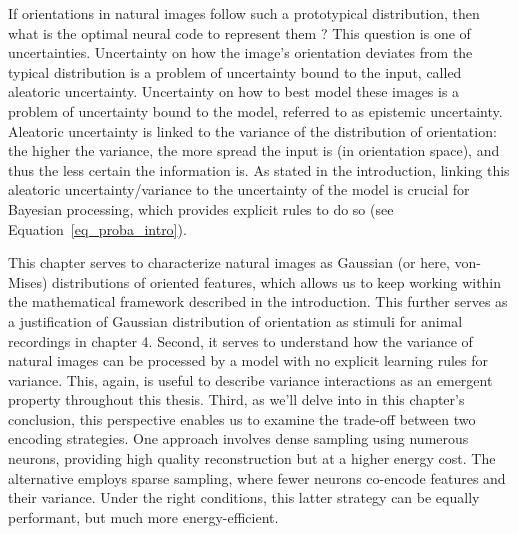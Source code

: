 If orientations in natural images follow such a prototypical distribution, then what is the optimal neural code to represent them ? This question is one of uncertainties. Uncertainty on how the image's orientation deviates from the typical distribution is a problem of uncertainty bound to the input, called aleatoric uncertainty. Uncertainty on how to best model these images is a problem of uncertainty bound to the model, referred to as epistemic uncertainty. Aleatoric uncertainty is linked to the variance of the distribution of orientation: the higher the variance, the more spread the input is (in orientation space), and thus the less certain the information is. As stated in the introduction, linking this aleatoric uncertainty/variance to the uncertainty of the model is crucial for Bayesian processing, which provides explicit rules to do so (see Equation~\ref{eq_proba_intro}). 

This chapter serves to characterize natural images as Gaussian (or here, von-Mises) distributions of oriented features, which allows us to keep working within the mathematical framework described in the introduction. This further serves as a justification of Gaussian distribution of orientation as stimuli for animal recordings in chapter 4. Second, it serves to understand how the variance of natural images can be processed by a model with no explicit learning rules for variance. This, again, is useful to describe variance interactions as an emergent property throughout this thesis. Third, as we'll delve into in this chapter's conclusion, this perspective enables us to examine the trade-off between two encoding strategies. One approach involves dense sampling using numerous neurons, providing high quality reconstruction but at a higher energy cost. The alternative employs sparse sampling, where fewer neurons co-encode features and their variance. Under the right conditions, this latter strategy can be equally performant, but much more energy-efficient.

